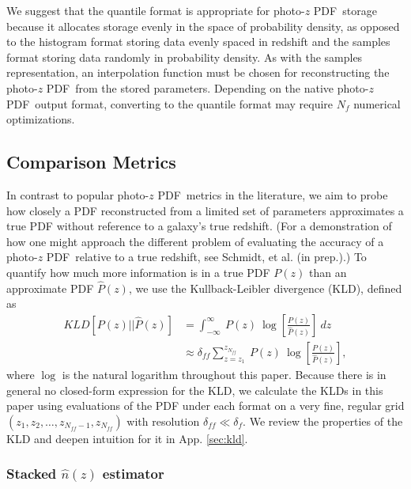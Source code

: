 \documentclass[\docopts]{\docclass}
\newcommand{\pz}{photo-$z$ PDF}
\begin{document}
We suggest that the quantile format is appropriate for \pz\ storage because it 
allocates storage evenly in the space of probability density, as opposed to the 
histogram format storing data evenly spaced in redshift and the samples format 
storing data randomly in probability density.  As with the samples 
representation, an interpolation function must be chosen for reconstructing the 
\pz\ from the stored parameters.  Depending on the native \pz\ output format, 
converting to the quantile format may require $N_{f}$ numerical optimizations.





\subsection{Comparison Metrics}
\label{sec:metric}

In contrast to popular \pz\ metrics in the literature, we aim to probe how 
closely a PDF reconstructed from a limited set of parameters approximates a 
true PDF without reference to a galaxy's true redshift.  (For a demonstration 
of how one might approach the different problem of evaluating the accuracy of a 
\pz\ relative to a true redshift, see Schmidt, et al. (in prep.).)  To quantify 
how much more information is in a true PDF $P(z)$ than an approximate PDF 
$\hat{P}(z)$, we use the Kullback-Leibler divergence (KLD), defined as
\begin{align}
  \label{eq:kld}
  KLD[P(z) || \hat{P}(z)] &= \int_{-\infty}^{\infty}\ P(z)\ 
\log\left[\frac{P(z)}{\hat{P}(z)}\right]\ dz\\
  &\approx \delta_{ff}\sum_{z=z_{1}}^{z_{N_{ff}}}\ P(z)\ 
\log\left[\frac{P(z)}{\hat{P}(z)}\right],
\end{align}
where $\log$ is the natural logarithm throughout this paper.  Because there is 
in general no closed-form expression for the KLD, we calculate the KLDs in this 
paper using evaluations of the PDF under each format on a very fine, regular 
grid $(z_{1}, z_{2}, \dots, z_{N_{ff}-1}, z_{N_{ff}})$ with resolution 
$\delta_{ff}\ll\delta_{f}$.  We review the properties of the KLD and deepen 
intuition for it in App. \ref{sec:kld}.

\subsubsection{Stacked $\hat{n}(z)$ estimator}
\label{sec:stacked_metric}
\end{document}
